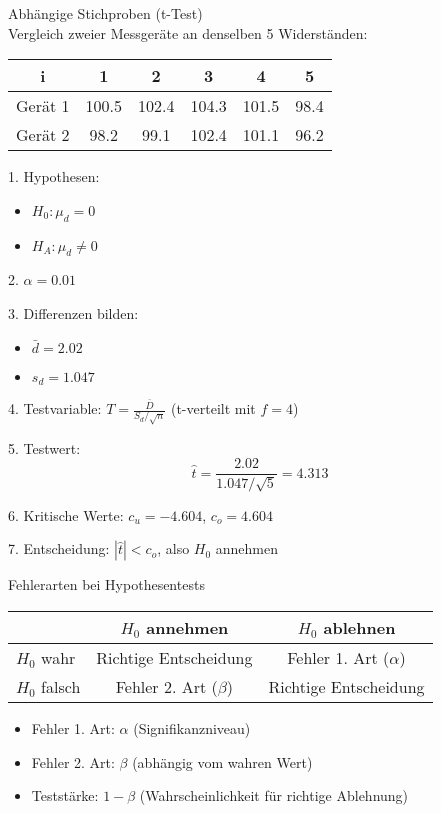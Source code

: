 \begin{example2}{Abhängige Stichproben (t-Test)}\\
Vergleich zweier Messgeräte an denselben 5 Widerständen:

\begin{center}
\begin{tabular}{|c|c|c|c|c|c|}
\hline
i & 1 & 2 & 3 & 4 & 5 \\
\hline
Gerät 1 & 100.5 & 102.4 & 104.3 & 101.5 & 98.4 \\
\hline
Gerät 2 & 98.2 & 99.1 & 102.4 & 101.1 & 96.2 \\
\hline
\end{tabular}
\end{center}

1. Hypothesen:
   \begin{itemize}
     \item $H_0: \mu_d = 0$
     \item $H_A: \mu_d \neq 0$
   \end{itemize}

2. $\alpha = 0.01$

3. Differenzen bilden:
   \begin{itemize}
     \item $\bar{d} = 2.02$
     \item $s_d = 1.047$
   \end{itemize}

4. Testvariable: $T = \frac{\bar{D}}{S_d/\sqrt{n}}$ (t-verteilt mit $f=4$)

5. Testwert:
   $$\hat{t} = \frac{2.02}{1.047/\sqrt{5}} = 4.313$$

6. Kritische Werte: $c_u = -4.604$, $c_o = 4.604$

7. Entscheidung: $|\hat{t}| < c_o$, also $H_0$ annehmen
\end{example2}

\begin{concept}{Fehlerarten bei Hypothesentests}\\
\begin{center}
\begin{tabular}{|l|c|c|}
\hline
& $H_0$ annehmen & $H_0$ ablehnen \\
\hline
$H_0$ wahr & Richtige Entscheidung & Fehler 1. Art ($\alpha$) \\
\hline
$H_0$ falsch & Fehler 2. Art ($\beta$) & Richtige Entscheidung \\
\hline
\end{tabular}
\end{center}

\begin{itemize}
  \item Fehler 1. Art: $\alpha$ (Signifikanzniveau)
  \item Fehler 2. Art: $\beta$ (abhängig vom wahren Wert)
  \item Teststärke: $1-\beta$ (Wahrscheinlichkeit für richtige Ablehnung)
\end{itemize}
\end{concept}

